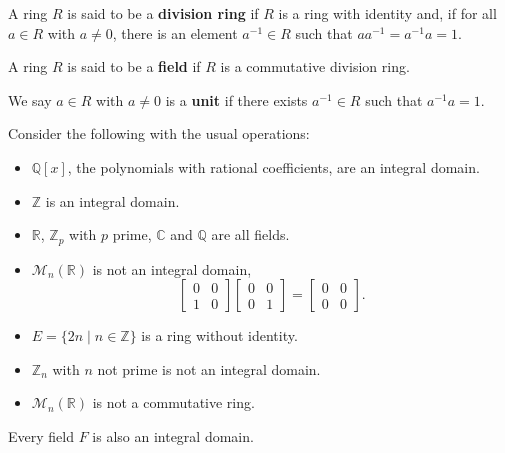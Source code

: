 \begin{definition}
	A ring $R$ is said to be a \textbf{division ring} if $R$ is a ring with identity and, if for all $a\in R$ with $a\neq 0$, there is an element $a^{-1}\in R$ such that $aa^{-1}=a^{-1}a=1$.
\end{definition}

\begin{definition}[field]
	A ring $R$ is said to be a \textbf{field} if $R$ is a commutative division ring.
\end{definition}

\begin{definition}[unit]
	We say $a\in R$ with $a\neq 0$ is a \textbf{unit} if there exists $a^{-1}\in R$ such that $a^{-1}a=1$.
\end{definition}

\begin{example}
	Consider the following with the usual operations:
	\begin{itemize}
		\item $\mathbb Q[x]$, the polynomials with rational coefficients, are an integral domain.
		\item $\mathbb Z$ is an integral domain.
		\item $\mathbb R$, $\mathbb Z_p$ with $p$ prime, $\mathbb C$ and $\mathbb Q$ are all fields.
		\item $\mathcal M_n(\mathbb R)$ is not an integral domain,
		$$\begin{bmatrix}
			0 & 0 \\ 1 & 0
		\end{bmatrix}\begin{bmatrix}
			0 & 0 \\ 0 & 1
		\end{bmatrix}=\begin{bmatrix}
			0 & 0 \\ 0 & 0
		\end{bmatrix}.$$
		\item $E=\{2n\mid n\in\mathbb Z\}$ is a ring without identity.
		\item $\mathbb Z_n$ with $n$ not prime is not an integral domain.
		\item $\mathcal M_n(\mathbb R)$ is not a commutative ring.
	\end{itemize}
\end{example}

\begin{proposition}
	Every field $F$ is also an integral domain.
\end{proposition}

